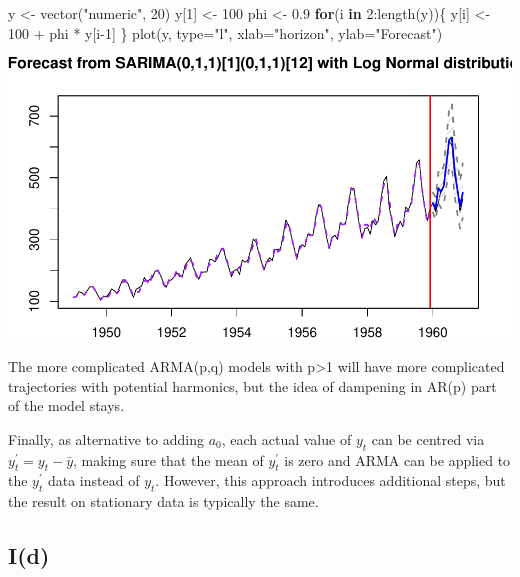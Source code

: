 \documentclass[
]{book}
\newenvironment{Shaded}{\begin{snugshade}}{\end{snugshade}}
\newcommand{\AttributeTok}[1]{\textcolor[rgb]{0.77,0.63,0.00}{#1}}
\newcommand{\ControlFlowTok}[1]{\textcolor[rgb]{0.13,0.29,0.53}{\textbf{#1}}}
\newcommand{\DecValTok}[1]{\textcolor[rgb]{0.00,0.00,0.81}{#1}}
\newcommand{\FloatTok}[1]{\textcolor[rgb]{0.00,0.00,0.81}{#1}}
\newcommand{\FunctionTok}[1]{\textcolor[rgb]{0.00,0.00,0.00}{#1}}
\newcommand{\NormalTok}[1]{#1}
\newcommand{\OtherTok}[1]{\textcolor[rgb]{0.56,0.35,0.01}{#1}}
\newcommand{\SpecialCharTok}[1]{\textcolor[rgb]{0.00,0.00,0.00}{#1}}
\newcommand{\StringTok}[1]{\textcolor[rgb]{0.31,0.60,0.02}{#1}}
\theoremstyle{definition}
\theoremstyle{definition}
\theoremstyle{definition}
\theoremstyle{definition}
\theoremstyle{remark}
\begin{document}
\begin{Shaded}
\begin{Highlighting}[]
\NormalTok{y }\OtherTok{\textless{}{-}} \FunctionTok{vector}\NormalTok{(}\StringTok{"numeric"}\NormalTok{, }\DecValTok{20}\NormalTok{)}
\NormalTok{y[}\DecValTok{1}\NormalTok{] }\OtherTok{\textless{}{-}} \DecValTok{100}
\NormalTok{phi }\OtherTok{\textless{}{-}} \FloatTok{0.9}
\ControlFlowTok{for}\NormalTok{(i }\ControlFlowTok{in} \DecValTok{2}\SpecialCharTok{:}\FunctionTok{length}\NormalTok{(y))\{}
\NormalTok{    y[i] }\OtherTok{\textless{}{-}} \DecValTok{100} \SpecialCharTok{+}\NormalTok{ phi }\SpecialCharTok{*}\NormalTok{ y[i}\DecValTok{{-}1}\NormalTok{]}
\NormalTok{\}}
\FunctionTok{plot}\NormalTok{(y, }\AttributeTok{type=}\StringTok{"l"}\NormalTok{, }\AttributeTok{xlab=}\StringTok{"horizon"}\NormalTok{, }\AttributeTok{ylab=}\StringTok{"Forecast"}\NormalTok{)}
\end{Highlighting}
\end{Shaded}

\includegraphics{adam_files/figure-latex/unnamed-chunk-54-1.pdf}

The more complicated ARMA(p,q) models with p\textgreater1 will have more complicated trajectories with potential harmonics, but the idea of dampening in AR(p) part of the model stays.

Finally, as alternative to adding \(a_0\), each actual value of \(y_t\) can be centred via \(y^\prime_t = y_t - \bar{y}\), making sure that the mean of \(y^\prime_t\) is zero and ARMA can be applied to the \(y^\prime_t\) data instead of \(y_t\). However, this approach introduces additional steps, but the result on stationary data is typically the same.

\hypertarget{Differences}{%
\subsection{I(d)}\label{Differences}}
\end{document}
